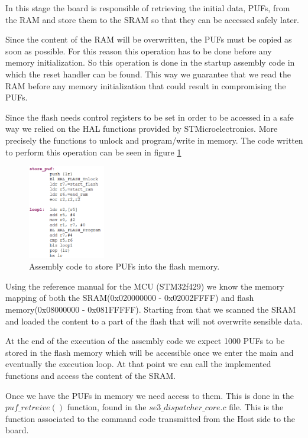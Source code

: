 In this stage the board is responsible of retrieving the initial data, PUFs, from the RAM and store them to the SRAM so that they can be accessed safely later.

Since the content of the RAM will be overwritten, the PUFs must be copied as soon as possible. For this reason this operation has to be done before any memory initialization. So this operation is done in the startup assembly code in which the reset handler can be found. This way we guarantee that we read the RAM before any memory initialization that could result in compromising the PUFs.

Since the flash needs control registers to be set in order to be accessed in a safe way we relied on the HAL functions provided by STMicroelectronics. More precisely the functions to unlock and program/write in memory. The code written to perform this operation can be seen in figure \ref{fig:code_assembly}

\begin{figure}[h!]
	\centering
	\vspace{0.5cm}
	\includegraphics[width = 0.3\textwidth]{images/code_assembly.png}
	\caption{Assembly code to store PUFs into the flash memory. }
	\label{fig:code_assembly}
\end{figure}

Using the reference manual for the MCU (STM32f429) we know the memory mapping of both the SRAM(0x020000000 -  0x02002FFFF) and flash memory(0x08000000 - 0x081FFFFF). Starting from that we scanned the SRAM and loaded the content to a part of the flash that will not overwrite sensible data.

At the end of the execution of the assembly code we expect 1000 PUFs to be stored in the flash memory which will be accessible once we enter the main and eventually the execution loop. At that point we can call the implemented functions and access the content of the SRAM.

Once we have the PUFs in memory we need access to them. This is done in the $puf\_retreive()$ function, found in the $se3\_dispatcher\_core.c$ file. This is the function associated to the command code transmitted from the Host side to the board.

